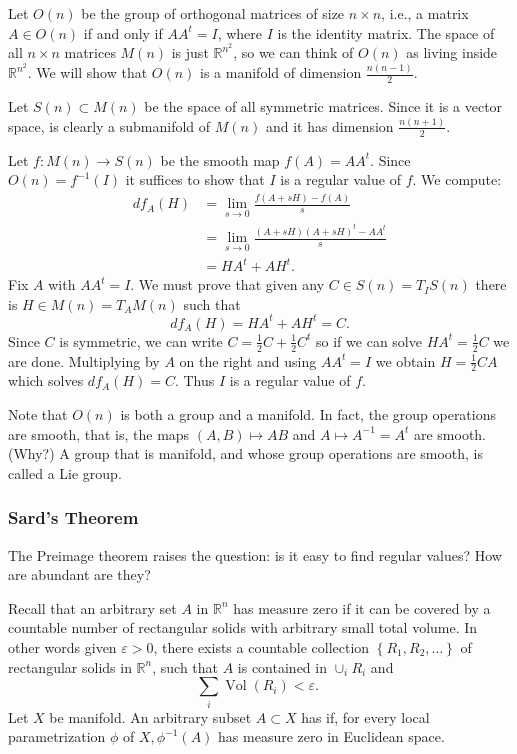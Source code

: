 \begin{example}
    Let $O(n)$ be the group of orthogonal matrices of size $n \times n$, i.e., a matrix $A \in O(n)$ if and only if $A A^{t}=I$, where $I$ is the identity matrix. The space of all $n \times n$
matrices $M(n)$ is just $\mathbb{R}^{n^{2}}$, so we can think of $O(n)$ as living inside $\mathbb{R}^{n^{2}}$. We will show that $O(n)$ is a manifold of dimension $\frac{n(n-1)}{2}$.

Let $S(n) \subset M(n)$ be the space of all symmetric matrices. Since it is a vector space, is clearly a submanifold of $M(n)$ and it has dimension $\frac{n(n+1)}{2}$.

Let $f: M(n) \rightarrow S(n)$ be the smooth map $f(A)=A A^{t}$. Since $O(n)=f^{-1}(I)$ it suffices to show that $I$ is a regular value of $f$. We compute:
$$
\begin{aligned}
d f_{A}(H) & =\lim _{s \rightarrow 0} \frac{f(A+s H)-f(A)}{s} \\
& =\lim _{s \rightarrow 0} \frac{(A+s H)(A+s H)^{t}-A A^{t}}{s} \\
& =H A^{t}+A H^{t}.
\end{aligned}
$$
Fix $A$ with $A A^{t}=I$. We must prove that given any $C \in S(n)=T_{I} S(n)$ there is $H \in M(n)=T_{A} M(n)$ such that
$$
d f_{A}(H)=H A^{t}+A H^{t}=C.
$$
Since $C$ is symmetric, we can write $C=\frac{1}{2} C+\frac{1}{2} C^{t}$ so if we can solve $H A^{t}=\frac{1}{2} C$ we are done. Multiplying by $A$ on the right and using $A A^{t}=I$ we obtain $H=\frac{1}{2} C A$ which solves $d f_{A}(H)=C$. Thus $I$ is a regular value of $f$.

Note that $O(n)$ is both a group and a manifold. In fact, the group operations are smooth, that is, the maps $(A, B) \mapsto A B$ and $A \mapsto A^{-1}=A^{t}$ are smooth. (Why?) A group that is manifold, and whose group operations are smooth, is called a Lie group.
\end{example}

\subsubsection{Sard's Theorem}

The Preimage theorem raises the question: is it easy to find regular values? How are abundant are they?

Recall that an arbitrary set $A$ in $\mathbb{R}^{n}$ has measure zero if it can be covered by a countable number of rectangular solids with arbitrary small total volume. In other words given $\varepsilon>0$, there exists a countable collection $\left\{R_{1}, R_{2}, \ldots\right\}$ of rectangular solids in $\mathbb{R}^{n}$, such that $A$ is contained in $\cup_{i} R_{i}$ and
$$
\sum_{i} \operatorname{Vol}\left(R_{i}\right)<\varepsilon \text {. }
$$
Let $X$ be manifold. An arbitrary subset $A \subset X$ has  if, for every local parametrization $\phi$ of $X, \phi^{-1}(A)$ has measure zero in Euclidean space.


